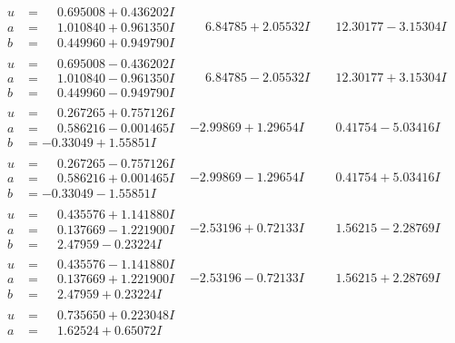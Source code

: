\documentclass[1p]{elsarticle_modified}
\theoremstyle{definition}
\begin{document}
$$\begin{array}{c|c|c}
\begin{aligned}
u &= \phantom{-}0.695008 + 0.436202 I \\
a &= \phantom{-}1.010840 + 0.961350 I \\
b &= \phantom{-}0.449960 + 0.949790 I\end{aligned}
 & \phantom{-}6.84785 + 2.05532 I & \phantom{-}12.30177 - 3.15304 I \\ \hline\begin{aligned}
u &= \phantom{-}0.695008 - 0.436202 I \\
a &= \phantom{-}1.010840 - 0.961350 I \\
b &= \phantom{-}0.449960 - 0.949790 I\end{aligned}
 & \phantom{-}6.84785 - 2.05532 I & \phantom{-}12.30177 + 3.15304 I \\ \hline\begin{aligned}
u &= \phantom{-}0.267265 + 0.757126 I \\
a &= \phantom{-}0.586216 - 0.001465 I \\
b &= -0.33049 + 1.55851 I\end{aligned}
 & -2.99869 + 1.29654 I & \phantom{-}0.41754 - 5.03416 I \\ \hline\begin{aligned}
u &= \phantom{-}0.267265 - 0.757126 I \\
a &= \phantom{-}0.586216 + 0.001465 I \\
b &= -0.33049 - 1.55851 I\end{aligned}
 & -2.99869 - 1.29654 I & \phantom{-}0.41754 + 5.03416 I \\ \hline\begin{aligned}
u &= \phantom{-}0.435576 + 1.141880 I \\
a &= \phantom{-}0.137669 - 1.221900 I \\
b &= \phantom{-}2.47959 - 0.23224 I\end{aligned}
 & -2.53196 + 0.72133 I & \phantom{-}1.56215 - 2.28769 I \\ \hline\begin{aligned}
u &= \phantom{-}0.435576 - 1.141880 I \\
a &= \phantom{-}0.137669 + 1.221900 I \\
b &= \phantom{-}2.47959 + 0.23224 I\end{aligned}
 & -2.53196 - 0.72133 I & \phantom{-}1.56215 + 2.28769 I \\ \hline\begin{aligned}
u &= \phantom{-}0.735650 + 0.223048 I \\
a &= \phantom{-}1.62524 + 0.65072 I \\

\end{aligned}
\end{array}$$
\end{document}
